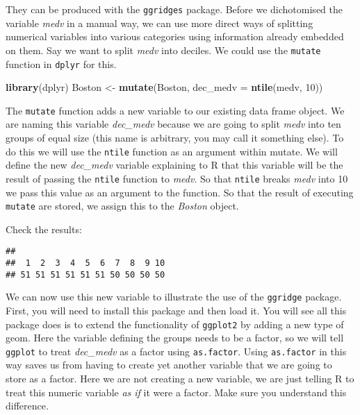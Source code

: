 \documentclass[
]{book}
\newenvironment{Shaded}{\begin{snugshade}}{\end{snugshade}}
\newcommand{\AttributeTok}[1]{\textcolor[rgb]{0.13,0.29,0.53}{#1}}
\newcommand{\DecValTok}[1]{\textcolor[rgb]{0.00,0.00,0.81}{#1}}
\newcommand{\FunctionTok}[1]{\textcolor[rgb]{0.13,0.29,0.53}{\textbf{#1}}}
\newcommand{\NormalTok}[1]{#1}
\newcommand{\OtherTok}[1]{\textcolor[rgb]{0.56,0.35,0.01}{#1}}
\newcommand{\SpecialCharTok}[1]{\textcolor[rgb]{0.81,0.36,0.00}{\textbf{#1}}}
\begin{document}
They can be produced with the \texttt{ggridges} package. Before we dichotomised the variable \emph{medv} in a manual way, we can use more direct ways of splitting numerical variables into various categories using information already embedded on them. Say we want to split \emph{medv} into deciles. We could use the \texttt{mutate} function in \texttt{dplyr} for this.

\begin{Shaded}
\begin{Highlighting}[]
\FunctionTok{library}\NormalTok{(dplyr)}
\NormalTok{Boston }\OtherTok{\textless{}{-}} \FunctionTok{mutate}\NormalTok{(Boston, }\AttributeTok{dec\_medv =} \FunctionTok{ntile}\NormalTok{(medv, }\DecValTok{10}\NormalTok{))}
\end{Highlighting}
\end{Shaded}

The \texttt{mutate} function adds a new variable to our existing data frame object. We are naming this variable \emph{dec\_medv} because we are going to split \emph{medv} into ten groups of equal size (this name is arbitrary, you may call it something else). To do this we will use the \texttt{ntile} function as an argument within mutate. We will define the new \emph{dec\_medv} variable explaining to R that this variable will be the result of passing the \texttt{ntile} function to \emph{medv}. So that \texttt{ntile} breaks \emph{medv} into 10 we pass this value as an argument to the function. So that the result of executing \texttt{mutate} are stored, we assign this to the \emph{Boston} object.

Check the results:

\begin{Shaded}
\end{Shaded}

\begin{verbatim}
## 
##  1  2  3  4  5  6  7  8  9 10 
## 51 51 51 51 51 51 50 50 50 50
\end{verbatim}

We can now use this new variable to illustrate the use of the \texttt{ggridge} package. First, you will need to install this package and then load it. You will see all this package does is to extend the functionality of \texttt{ggplot2} by adding a new type of geom. Here the variable defining the groups needs to be a factor, so we will tell \texttt{ggplot} to treat \emph{dec\_medv} as a factor using \texttt{as.factor}. Using \texttt{as.factor} in this way saves us from having to create yet another variable that we are going to store as a factor. Here we are not creating a new variable, we are just telling R to treat this numeric variable \emph{as if} it were a factor. Make sure you understand this difference.
\end{document}
